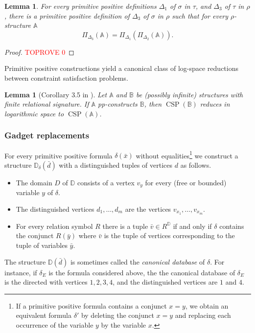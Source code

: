 \documentclass{article}
\newtheorem{lemma}[theorem]{Lemma}
\theoremstyle{definition}
\theoremstyle{remark}
\DeclareMathOperator{\CSP}{CSP}
\newcommand{\bA}{{\mathbb A}}
\newcommand{\bB}{{\mathbb B}}
\newcommand{\bD}{{\mathbb D}}
\begin{document}
\begin{lemma}\label{lem:pp-def-compose}
    For every primitive positive definitions $\Delta_1$ of $\sigma$ in $\tau$, and
    $\Delta_3$ of $\tau$ in $\rho$, there is a primitive positive definition
    of $\Delta_3$ of $\sigma$ in $\rho$ such that for every $\rho$-structure $\bA$
    \[
    \Pi_{\Delta_3}(\bA) = \Pi_{\Delta_1}(\Pi_{\Delta_2}(\bA)).
    \]
\end{lemma}
\begin{proof}\textcolor{red}{TOPROVE 0}\end{proof}



Primitive positive constructions yield a canonical class of log-space reductions between
constraint satisfaction problems. 

\begin{lemma}[Corollary 3.5 in \cite{wonderland}]
\label{lem:pp-construction-reduction}
    Let $\bA$ and $\bB$ be (possibly infinite) structures with finite relational
    signature. If $\bA$ pp-constructs $\bB$, then $\CSP(\bB)$ reduces in logarithmic space
    to $\CSP(\bA)$. 
\end{lemma}

\subsubsection*{Gadget replacements}

For every primitive positive formula $\delta(\bar x)$ without equalities\footnote{If a 
primitive positive formula contains a conjunct $x = y$, we obtain an equivalent formula
$\delta'$ by deleting the conjunct $x = y$ and replacing each occurrence of the variable
$y$ by the variable $x$.} we construct a structure $\bD_\delta(\bar d)$
with a distinguished tuples of vertices $d$ as follows.
\begin{itemize}
    \item The domain $D$ of $\bD$ consists of a vertex $v_y$ for every (free or bounded) variable $y$ of $\delta$.
    \item The distinguished vertices $d_1,\dots, d_m$ are the vertices $v_{x_1},\dots, v_{x_m}$.
    \item For every relation symbol $R$ there is a tuple $\bar{v} \in R^{\bD}$ if and only if $\delta$
    contains the conjunct $R(\bar{y})$ where $\bar v$ is the tuple of vertices corresponding to the
    tuple of variables $\bar y$.
\end{itemize}
The structure $\bD(\bar d)$ is sometimes called the \emph{canonical database} of $\delta$. 
For instance, if $\delta_E$ is the formula considered above, the the canonical database of $\delta_E$
is the directed with vertices $1,2,3,4$, and the distinguished vertices are $1$ and $4$.
\end{document}
